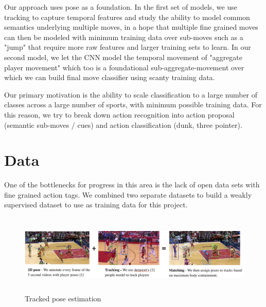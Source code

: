 \documentclass{article}
\begin{document}
Our approach uses pose as a foundation. In the first set of models, we use tracking to capture temporal features and study the ability to model common semantics underlying multiple moves, in a hope that multiple fine grained moves can then be modeled with minimum training data over sub-moves such as a "jump" that require more raw features and larger training sets to learn. In our second model, we let the CNN model the temporal movement of "aggregate player movement" which too is a foundational sub-aggregate-movement over which we can build final move classifier using scanty training data. 

Our primary motivation is the ability to scale classification to a large number of classes across a large number of sports, with minimum possible training data. For this reason, we try to break down action recognition into action proposal (semantic sub-moves / cues) and action classification (dunk, three pointer).

\section{Data}
\label{data}
One of the bottlenecks for progress in this area is the lack of open data sets with fine grained action tags. We combined two separate datasets to build a weakly supervised dataset to use as training data for this project.


\begin{figure}[ht]
\begin{center}
\centerline{\includegraphics[height=1.5in]{trackpose.png}}
\caption{Tracked pose estimation}
\label{fig:trackpose}
\end{center}
\vskip -0.3in
\end{figure}
\end{document}
